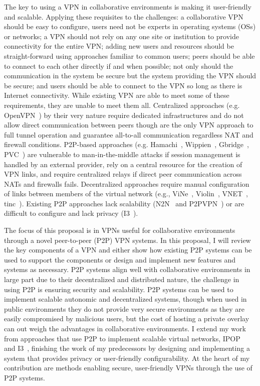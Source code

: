 The key to using a VPN in collaborative environments is making it user-friendly
and scalable.  Applying these requisites to the challenges:  a collaborative
VPN should be easy to configure, users need not be experts in operating systems
(OSs) or networks; a VPN should not rely on any one site or institution to
provide connectivity for the entire VPN; adding new users and resources should
be straight-forward using approaches familiar to common users; peers should be
able to connect to each other directly if and when possible; not only should
the communication in the system be secure but the system providing the VPN
should be secure; and users should be able to connect to the VPN so long as
there is Internet connectivity.  While existing VPN are able to meet some of
these requirements, they are unable to meet them all.  Centralized approaches
(e.g.  OpenVPN~\cite{openvpn}) by their very nature require dedicated
infrastructures and do not allow direct communication between peers though are
the only VPN approach to full tunnel operation and guarantee all-to-all
communication regardless NAT and firewall conditions.  P2P-based approaches
(e.g. Hamachi~\cite{hamachi}, Wippien~\cite{wippien}, Gbridge~\cite{gbridge},
PVC~\cite{pvc}) are vulnerable to man-in-the-middle attacks if session
management is handled by an external provider, rely on a central resource for
the creation of VPN links, and require centralized relays if direct peer
communication across NATs and firewalls fails.  Decentralized approaches
require manual configuration of links between members of the virtual network
(e.g., ViNe~\cite{vine}, Violin~\cite{violin}, VNET~\cite{vnet},
tinc~\cite{tinc}).  Existing P2P approaches lack scalability (N2N~\cite{n2n}
and P2PVPN~\cite{p2pvpn}) or are difficult to configure and lack privacy
(I3~\cite{i3}).

The focus of this proposal is in VPNs useful for collaborative environments
through a novel peer-to-peer (P2P) VPN systems.  In this proposal, I will
review the key components of a VPN and either show how existing P2P systems can
be used to support the components or design and implement new features and
systems as necessary.  P2P systems align well with collaborative environments
in large part due to their decentralized and distributed nature, the challenge
in using P2P is ensuring security and scalability.  P2P systems can be used
to implement scalable autonomic and decentralized systems, though when used
in public environments they do not provide very secure environments as they
are easily compromised by malicious users, but the cost of hosting a private
overlay can out weigh the advantages in collaborative environments.  I extend
my work from approaches that use P2P to implement scalable virtual networks,
IPOP~\cite{ipop} and I3~\cite{i3}, finishing the work of my predecessors by
designing and implementing a system that provides privacy or user-friendly
configurability.  At the heart of my contribution are methods enabling secure,
user-friendly VPNs through the use of P2P systems.

